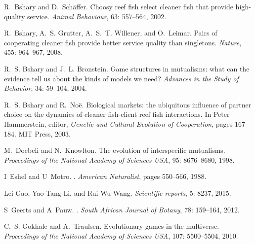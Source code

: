 \documentclass[12pt]{article}
\begin{document}
\begin{thebibliography}{61}
R.~Bshary and D.~Sch{\"a}ffer.
\newblock Choosy reef fish select cleaner fish that provide high-quality
  service.
\newblock \emph{Animal Behaviour}, 63: 557--564, 2002.

R.~Bshary, A.~S. Grutter, A.~S.~T. Willener, and O.~Leimar.
\newblock Pairs of cooperating cleaner fish provide better service quality than
  singletons.
\newblock \emph{Nature}, 455: 964--967, 2008.

R.~S. Bshary and J.~L. Bronstein.
\newblock Game structures in mutualisms: what can the evidence tell us about
  the kinds of models we need?
\newblock \emph{Advances in the Study of Behavior}, 34: 59--104, 2004.

R.~S. Bshary and R.~No{\"{e}}.
\newblock Biological markets: the ubiquitous influence of partner choice on the
  dynamics of cleaner fish-client reef fish interactions.
\newblock In Peter Hammerstein, editor, \emph{Genetic and Cultural Evolution of
  Cooperation}, pages 167--184. MIT Press, 2003.

M.~Doebeli and N.~Knowlton.
\newblock The evolution of interspecific mutualisms.
\newblock \emph{Proceedings of the National Academy of Sciences USA},
  95: 8676--8680, 1998.

I~Eshel and U~Motro.
.
\newblock \emph{American Naturalist}, pages 550--566, 1988.

Lei Gao, Yao-Tang Li, and Rui-Wu Wang.
\newblock \emph{Scientific reports}, 5: 8237, 2015.

S~Geerts and A~Pauw.
.
\newblock \emph{South African Journal of Botany}, 78: 159--164, 2012.

C.~S. Gokhale and A.~Traulsen.
\newblock Evolutionary games in the multiverse.
\newblock \emph{Proceedings of the National Academy of Sciences USA},
  107: 5500--5504, 2010.


\end{thebibliography}
\end{document}
